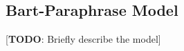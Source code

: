 \documentclass[fleqn,moreauthors,10pt]{ds_report}
\begin{document}





\subsection{Bart-Paraphrase Model}

[\textbf{TODO}: Briefly describe the model]
\end{document}
